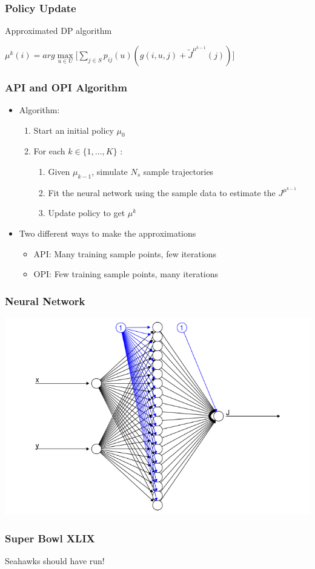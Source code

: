 \documentclass{beamer}
\begin{document}
\begin{frame}
\frametitle{Policy Update}
\begin{block}{Approximated DP algorithm}
\begin{center}
$\mu^{k}(i) = arg\max\limits_{u \in U} \Big[ \sum\limits_{j \in S} p_{ij}(u)(g(i,u,j) +  \widetilde{J}^{\mu^{k-1}}(j))\Big]$
\end{center}
\end{block}
\end{frame}

\begin{frame}
\frametitle{API and OPI Algorithm}
\begin{itemize}
\item Algorithm:
\begin{enumerate}
\item Start an initial policy $\mu_{0}$
\item For each $k \in \{1,\ldots, K\}$ :
\begin{enumerate}
\item Given $\mu_{k-1}$, simulate $N_{s}$ sample trajectories
\item Fit the neural network using the sample data to estimate the $J^{\mu^{k-1}}$
\item Update policy to get $\mu^{k}$
\end{enumerate}
\end{enumerate}
\item Two different ways to make the approximations
\begin{itemize}
\item API: Many training sample points, few iterations
\item OPI: Few training sample points, many iterations
\end{itemize}
\end{itemize}

\end{frame}

\begin{frame}
\frametitle{Neural Network}
\includegraphics[scale=0.65]{neuralnet}
\end{frame}

\begin{frame}
\frametitle{Super Bowl XLIX}
\begin{center}
Seahawks should have run!
\end{center}
\end{frame}
\end{document}
